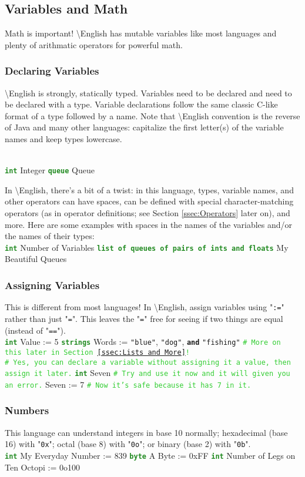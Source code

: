 \documentclass{article}
\newcommand{\name}{\textbackslash{}English}				%
\newcommand{\ssecl}[1]{\subsection{#1}\label{ssec:#1}}
\newcommand{\sssecl}[1]{\subsubsection{#1}\label{sssec:#1}}
\newcommand{\commentline}[1]{\texttt{\textcolor{LimeGreen}{#1}}}
\newcommand{\type}[1]{\texttt{\textcolor{ForestGreen}{\textbf{#1}}}}
\newcommand{\common}[1]{\texttt{\textcolor{Mulberry}{\textbf{#1}}}}
\newcommand{\codestring}[1]{\texttt{\textcolor{NavyBlue}{"#1"}}}
\newenvironment{code}[0]
{\ttfamily{}				%
\setlength\parindent{0cm}	%
~\\}
{\setlength\parindent{1cm}
~\\}
\begin{document}
\ssecl{Variables and Math}
\indent Math is important! \name{} has mutable variables like most languages and plenty of arithmatic operators for powerful math.

\sssecl{Declaring Variables}
\indent \name{} is strongly, statically typed. Variables need to be declared and need to be declared with a type. Variable declarations follow the same classic C-like format of a type followed by a name. Note that \name{} convention is the reverse of Java and many other languages: capitalize the first letter(s) of the variable names and keep types lowercase.

\begin{code}
\type{int} Integer
\type{queue} Queue
\end{code}

In \name{}, there's a bit of a twist: in this language, types, variable names, and other operators can have spaces, can be defined with special character-matching operators (as in operator definitions; see Section \ref{ssec:Operators} later on), and more. Here are some examples with spaces in the names of the variables and/or the names of their types:
\begin{code}
\type{int} Number of Variables
\type{list of queues of pairs of ints and floats} My Beautiful Queues
\end{code}

\sssecl{Assigning Variables}
\indent This is different from most languages! In \name{}, assign variables using "\texttt{:=}" rather than just "\texttt{=}". This leaves the "\texttt{=}" free for seeing if two things are equal (instead of "\texttt{==}").
\begin{code}
\type{int} Value := 5
\type{strings} Words := \codestring{blue}, \codestring{dog}, \common{and} \codestring{fishing} \commentline{\# More on this later in Section \ref{ssec:Lists and More}!}\\
\commentline{\# Yes, you can declare a variable without assigning it a value, then assign it later.}
\type{int} Seven	\commentline{\# Try and use it now and it will given you an error.}
Seven := 7	\commentline{\# Now it's safe because it has 7 in it.}
\end{code}

\sssecl{Numbers}
\indent This language can understand integers in base 10 normally; hexadecimal (base 16) with "\texttt{0x}"; octal (base 8) with "\texttt{0o}"; or binary (base 2) with "\texttt{0b}".
\begin{code}
\type{int} My Everyday Number := 839
\type{byte} A Byte := 0xFF
\type{int} Number of Legs on Ten Octopi := 0o100
\end{code}
\end{document}
